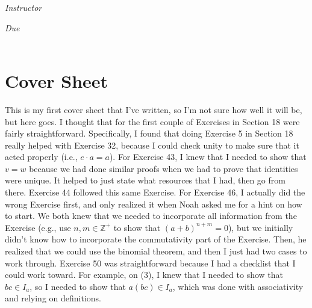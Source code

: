 \documentclass[12pt, oneside]{book}
\newcommand{\Z}{\mathbb{Z}}
\begin{document}
\begin{titlepage}
\begin{center}
\begin{large}
            \vspace*{1\baselineskip}

            \textit{Instructor} \\[1ex] %
            \professor

            \vspace*{1\baselineskip}

            \textit{Due}\\[1ex]
            {\scshape  \finaldate} \\[0.3\baselineskip] %

            \thispagestyle{empty}

        \end{large}
    \end{center}
\end{titlepage}




\section*{Cover Sheet}

This is my first cover sheet that I've written, so I'm not sure how well it will be, but here goes. I thought that for the first couple of Exercises in Section 18 were fairly straightforward. Specifically, I found that doing Exercise 5 in Section 18 really helped with Exercise 32, because I could check unity to make sure that it acted properly (i.e., \(e \cdot a = a\)). For Exercise 43, I knew that I needed to show that \(v = w\) because we had done similar proofs when we had to prove that identities were unique. It helped to just state what resources that I had, then go from there. Exercise 44 followed this same Exercise. For Exercise 46, I actually did the wrong Exercise first, and only realized it when Noah asked me for a hint on how to start. We both knew that we needed to incorporate all information from the Exercise (e.g., use \(n,m \in \Z^{+}\) to show that \((a + b)^{n + m} = 0\)), but we initially didn't know how to incorporate the commutativity part of the Exercise. Then, he realized that we could use the binomial theorem, and then I just had two cases to work through. Exercise 50 was straightforward because I had a checklist that I could work toward. For example, on (3), I knew that I needed to show that \(bc \in I_{a}\), so I needed to show that \(a(bc) \in I_{a}\), which was done with associativity and relying on definitions. \\
\end{document}
